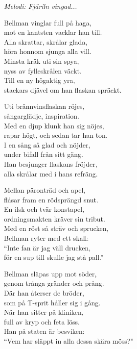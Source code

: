 {\footnotesize\textit{Melodi: Fjäriln vingad...}}\par
\vspace{10pt}
Bellman vinglar full på haga,\\
mot en kantsten vacklar han till.\\
Alla skrattar, skrålar glada,\\
höra honnom sjunga alla vill.\\
Minsta kräk uti sin spya,\\
nyss av fylleskrålen väckt.\\
Till en ny högaktig yra,\\
stackars djävel om han flaskan spräckt.\par
\vspace{10pt}
Uti brännvinsflaskan röjes,\\
sångarglädje, inspiration.\\
Med en djup klunk han sig nöjes,\\
rapar högt, och sedan tar han ton.\\
I en sång så glad och nöjder,\\
under bifall från sitt gäng.\\
Han besjunger flaskans fröjder,\\
alla skrålar med i hans refräng.\par
\vspace{10pt}
Mellan päronträd och apel,\\
flåsar fram en rödsprängd snut.\\
En ilsk och tvär konstapel,\\
ordningsmakten kräver sin tribut.\\
Med en röst så sträv och sprucken,\\
Bellman ryter med ett skall:\\
``Inte fan är jag väll drucken,\\
för en sup till skulle jag stå pall.''\par
\vspace{10pt}
Bellman släpas upp mot söder,\\
genom trånga gränder och prång.\\
Där han återser de bröder,\\
som på T-sprit håller sig i gång.\\
När han sitter på kliniken,\\
full av kryp och feta löss.\\
Han på staten är besviken:\\
``Vem har släppt in alla dessa skära möss?''
